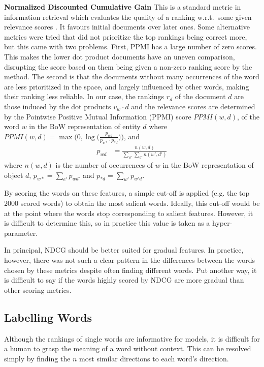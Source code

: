 \noindent \textbf{Normalized Discounted Cumulative Gain} %
This is a standard metric in information retrieval which evaluates the quality of a ranking w.r.t.\ some given relevance scores \cite{jarvelin2002cumulated}. It favours initial documents over later ones.  Some alternative metrics were tried that did not prioritize the top rankings being correct more, but this came with two problems. First, PPMI has a large number of zero scores. This makes the lower dot product documents have an uneven comparison, disrupting the score based on them being given a non-zero ranking score by the method. The second is that the documents without many occurrences of the word are less prioritized in the space, and largely influenced by other words, making their ranking less reliable.  In our case, the rankings $r_d$ of the document $d$ are those induced by the dot products $v_w \cdot d$ and the relevance scores are determined by the Pointwise Positive Mutual Information (PPMI) score $\textit{PPMI}(w,d)$, of the word $w$ in the BoW representation of entity $d$ where
$\textit{PPMI}(w,d) = \max \big(0, \log\big(\frac{p_{wd}}{p_{w*} \cdotp p_{*d}}\big)\big)$, and
\begin{align*}
p_{wd} &= \frac{n(w, d)}{\sum_{w'} \sum_{d'} n(w', d')}
\end{align*}
where $n(w,d)$ is the number of occurrences of $w$ in the BoW representation of object $d$, $p_{w*} = \sum_{e'} p_{wd'}$ and $p_{*d} = \sum_{w'} p_{w'd}$. %
\smallskip

By scoring the words on these features, a simple cut-off is applied (e.g. the top 2000 scored words) to obtain the most salient words. Ideally, this cut-off would be at the point where the words stop corresponding to salient features. However, it is difficult to determine this, so in practice this value is taken as a hyper-parameter.

In principal, NDCG should be better suited for gradual features. In practice, however, there was not such a clear pattern in the differences between the words chosen by these metrics despite often finding different words. Put another way, it is difficult to say if the words highly scored by NDCG are more gradual than other scoring metrics.%

\subsection{Labelling Words}\label{ch3:LabellingWords}
Although the rankings of single words are informative for models, it is difficult for a human to grasp the meaning of a word without context. This can be resolved simply by finding the $n$ most similar directions to each word's direction.

